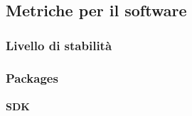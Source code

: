\subsection{Metriche per il software}

\subsubsection{Livello di stabilità}

\subsubsection{Packages}

\paragraph{SDK}

